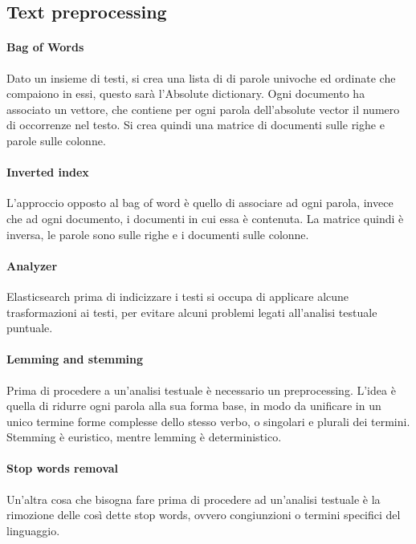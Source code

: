 \subsection{Text preprocessing}

\paragraph{Bag of Words}
Dato un insieme di testi, si crea una lista di di parole univoche ed ordinate che compaiono in essi, 
questo sarà l'Absolute dictionary.
Ogni documento ha associato un vettore, che contiene per ogni parola dell'absolute vector
il numero di occorrenze nel testo.
Si crea quindi una matrice di documenti sulle righe e parole sulle colonne.

\paragraph{Inverted index}
L'approccio opposto al bag of word è quello di associare ad ogni parola, invece che ad ogni 
documento, i documenti in cui essa è contenuta.
La matrice quindi è inversa, le parole sono sulle righe e i documenti sulle colonne.

\paragraph{Analyzer}
Elasticsearch prima di indicizzare i testi si occupa di applicare alcune trasformazioni 
ai testi, per evitare alcuni problemi legati all'analisi testuale puntuale.

\paragraph{Lemming and stemming}
Prima di procedere a un'analisi testuale è necessario un preprocessing.
L'idea è quella di ridurre ogni parola alla sua forma base, in modo da unificare in un 
unico termine forme complesse dello stesso verbo, o singolari e plurali dei termini.
Stemming è euristico, mentre lemming è deterministico.

\paragraph{Stop words removal}
Un'altra cosa che bisogna fare prima di procedere ad un'analisi testuale è 
la rimozione delle così dette stop words, ovvero congiunzioni o termini specifici del 
linguaggio.

